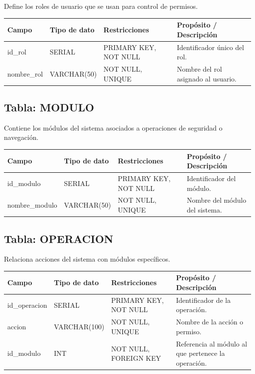 \documentclass[12pt,a4paper]{article}
\begin{document}
Define los roles de usuario que se usan para control de permisos.

\begin{longtable}{|p{3.5cm}|p{2.5cm}|p{3.5cm}|p{5cm}|}
\hline
\textbf{Campo} & \textbf{Tipo de dato} & \textbf{Restricciones} & \textbf{Propósito / Descripción} \\
\hline
id\_rol & SERIAL & PRIMARY KEY, NOT NULL & Identificador único del rol. \\
\hline
nombre\_rol & VARCHAR(50) & NOT NULL, UNIQUE & Nombre del rol asignado al usuario. \\
\hline
\end{longtable}

\subsection{Tabla: MODULO}

Contiene los módulos del sistema asociados a operaciones de seguridad o navegación.

\begin{longtable}{|p{3.5cm}|p{2.5cm}|p{3.5cm}|p{5cm}|}
\hline
\textbf{Campo} & \textbf{Tipo de dato} & \textbf{Restricciones} & \textbf{Propósito / Descripción} \\
\hline
id\_modulo & SERIAL & PRIMARY KEY, NOT NULL & Identificador del módulo. \\
\hline
nombre\_modulo & VARCHAR(50) & NOT NULL, UNIQUE & Nombre del módulo del sistema. \\
\hline
\end{longtable}

\subsection{Tabla: OPERACION}

Relaciona acciones del sistema con módulos específicos.

\begin{longtable}{|p{3.5cm}|p{2.5cm}|p{3.5cm}|p{5cm}|}
\hline
\textbf{Campo} & \textbf{Tipo de dato} & \textbf{Restricciones} & \textbf{Propósito / Descripción} \\
\hline
id\_operacion & SERIAL & PRIMARY KEY, NOT NULL & Identificador de la operación. \\
\hline
accion & VARCHAR(100) & NOT NULL, UNIQUE & Nombre de la acción o permiso. \\
\hline
id\_modulo & INT & NOT NULL, FOREIGN KEY & Referencia al módulo al que pertenece la operación. \\
\hline
\end{longtable}
\end{document}
